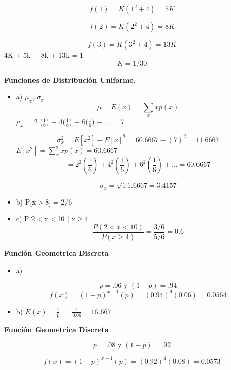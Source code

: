 \documentclass{../oxmathproblems}
\begin{document}
\begin{questions}
\begin{itemize}
$$f(1) = K(1^2 + 4) =  5K $$

$$f(2) = K(2^2 + 4) =  8K $$

$$f(3) = K(3^2 + 4) =  13K $$
4K + 5k + 8k + 13k = 1
$$ K = 1/30 $$
\end{itemize}

\miquestion\textbf{Funciones de Distribución Uniforme. }
\begin{itemize}
\item  a) $\mu_x$, $\sigma_x$
$$ \mu = E(x)= \sum_x xp(x)$$ 
 $\mu_x$ = 2 ($\frac{1}{6} $) + 4($\frac{1}{6} $) + 6($\frac{1}{6} $) + ... = 7 

$$ \sigma_x^2 = E[x^2]-E[x]^2 = 60.6667 - (7)^2 = 11.6667 $$ 
 $ E[x^2] = \sum_x^2 xp(x)  = 60.6667 $ 
 $$ = 2^2 (\frac{1}{6}) + 4^2(\frac{1}{6}) + 6^2(\frac{1}{6}) + ... =  60.6667 $$ 
 
 $$ \sigma_x  = \sqrt11.6667 = 3.4157 $$ 


\item  b) P[x$>$8] = 2/6

\item  c) P[2$<$x$<$10 $\mid$ x$\geq$4]
= $$  \frac{P(2 < x <10)}{P (x \geq 4)} = \frac{3/6}{5/6} = 0.6 $$ 
\end{itemize}

\miquestion\textbf { Función Geometrica Discreta}
\begin{itemize}
\item a)


$$ p = .06 \text{ y }
(1 - p )= .94 $$ 
$$ f(x) = (1-p)^{x-1} (p)  = (0.94)^9(0.06) = 0.0564 $$
\item b) 
$ E(x) = \frac{1}{p} $ 
$ = \frac{1}{0.06} = 16.667 $
\end{itemize}

\miquestion\textbf { Función Geometrica Discreta}

$$ p = .08 \text{ y }
(1 - p )= .92 $$ 

$$ f(x) = (1-p)^{x-1} (p)  = (0.92)^4(0.08) = 0.0573 $$

\end {questions}
\end{document}
